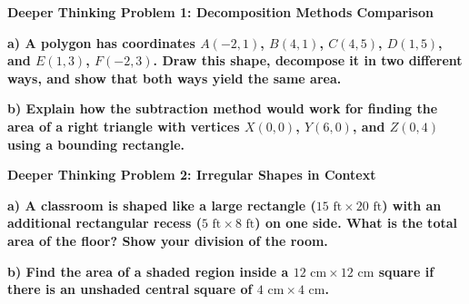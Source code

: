 \documentclass[12pt, letterpaper, fleqn]{article}
\begin{document}
\begin{tcolorbox}[colback=black!5, colframe=black!50, boxrule=1pt, arc=4mm, left=6mm, right=6mm, top=5mm, bottom=5mm]
\textbf{Deeper Thinking Problem 1: Decomposition Methods Comparison}

\medskip

\noindent
\textbf{a) A polygon has coordinates $A(-2, 1)$, $B(4, 1)$, $C(4, 5)$, $D(1, 5)$, and $E(1, 3)$, $F(-2, 3)$. Draw this shape, decompose it in two different ways, and show that both ways yield the same area.}

\vspace{2.5cm}

\noindent
\textbf{b) Explain how the subtraction method would work for finding the area of a right triangle with vertices $X(0, 0)$, $Y(6, 0)$, and $Z(0, 4)$ using a bounding rectangle.}

\vspace{2cm}
\end{tcolorbox}
\newpage

\begin{tcolorbox}[colback=black!5, colframe=black!50, boxrule=1pt, arc=4mm, left=6mm, right=6mm, top=5mm, bottom=5mm]
\textbf{Deeper Thinking Problem 2: Irregular Shapes in Context}

\medskip

\noindent
\textbf{a) A classroom is shaped like a large rectangle ($15\text{ ft} \times 20\text{ ft}$) with an additional rectangular recess ($5\text{ ft} \times 8\text{ ft}$) on one side. What is the total area of the floor? Show your division of the room.}

\vspace{2.5cm}

\noindent
\textbf{b) Find the area of a shaded region inside a $12\text{ cm} \times 12\text{ cm}$ square if there is an unshaded central square of $4\text{ cm} \times 4\text{ cm}$.}

\vspace{2cm}
\end{tcolorbox}
\newpage
\end{document}

